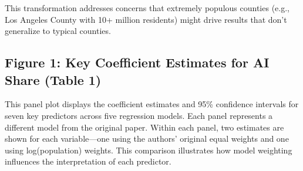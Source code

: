\documentclass[
]{article}
\begin{document}
This transformation addresses concerns that extremely populous counties
(e.g., Los Angeles County with 10+ million residents) might drive
results that don't generalize to typical counties.

\subsection{Figure 1: Key Coefficient Estimates for AI Share (Table
1)}\label{figure-1-key-coefficient-estimates-for-ai-share-table-1}

This panel plot displays the coefficient estimates and 95\% confidence
intervals for seven key predictors across five regression models. Each
panel represents a different model from the original paper. Within each
panel, two estimates are shown for each variable---one using the
authors' original equal weights and one using log(population) weights.
This comparison illustrates how model weighting influences the
interpretation of each predictor.
\end{document}
